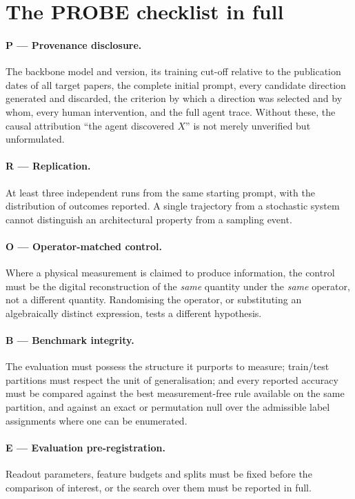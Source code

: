 \documentclass[11pt,a4paper]{article}
\begin{document}
\section{The PROBE checklist in full}
\label{app:probe}

\paragraph{P --- Provenance disclosure.}
The backbone model and version, its training cut-off relative to the
publication dates of all target papers, the complete initial prompt, every
candidate direction generated and discarded, the criterion by which a
direction was selected and by whom, every human intervention, and the full
agent trace. Without these, the causal attribution ``the agent discovered
$X$'' is not merely unverified but unformulated.

\paragraph{R --- Replication.}
At least three independent runs from the same starting prompt, with the
distribution of outcomes reported. A single trajectory from a stochastic
system cannot distinguish an architectural property from a sampling event.

\paragraph{O --- Operator-matched control.}
Where a physical measurement is claimed to produce information, the control
must be the digital reconstruction of the \emph{same} quantity under the
\emph{same} operator, not a different quantity. Randomising the operator, or
substituting an algebraically distinct expression, tests a different
hypothesis.

\paragraph{B --- Benchmark integrity.}
The evaluation must possess the structure it purports to measure; train/test
partitions must respect the unit of generalisation; and every reported
accuracy must be compared against the best measurement-free rule available on
the same partition, and against an exact or permutation null over the
admissible label assignments where one can be enumerated.

\paragraph{E --- Evaluation pre-registration.}
Readout parameters, feature budgets and splits must be fixed before the
comparison of interest, or the search over them must be reported in full.
\end{document}
